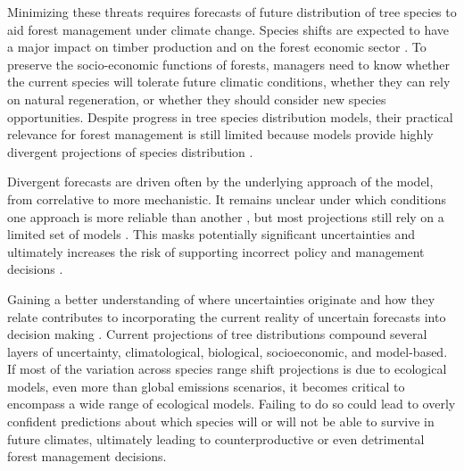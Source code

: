 \documentclass[11pt,letter]{article}
\begin{document}
Minimizing these threats requires forecasts of future distribution of tree species to aid forest management under climate change. Species shifts are expected to have a major impact on timber production and on the forest economic sector \citep{Wessely2024, Hanewinkel2013}. To preserve the socio-economic functions of forests, managers need to know whether the current species will tolerate future climatic conditions, whether they can rely on natural regeneration, or whether they should consider new species opportunities. %
Despite progress in tree species distribution models, their practical relevance for forest management is still limited because models provide highly divergent projections of species distribution \citep{Morin2009, Keenan2011a, Cheaib2012, Takolander2019}.

Divergent forecasts are driven often by the underlying approach of the model, from correlative to more mechanistic. It remains unclear under which conditions one approach is more reliable than another \citep{VanderMeersch2025}, but most projections still rely on a limited set of models \citep{Dyderski2018, Wessely2024, Hanewinkel2013, Schueler2014}. This masks potentially significant uncertainties and ultimately increases the risk of supporting incorrect policy and management decisions \citep{Dawson2011}. 

Gaining a better understanding of where uncertainties originate and how they relate contributes to incorporating the current reality of uncertain forecasts into decision making \citep{Urban2016, Saltelli2020, Johnson2024, Simmonds2024}. Current projections of tree distributions compound several layers of uncertainty, climatological, biological, socioeconomic, and model-based. If most of the variation across species range shift projections is due to ecological models, even more than global emissions scenarios, it becomes critical to encompass a wide range of ecological models. Failing to do so could lead to overly confident predictions about which species will or will not be able to survive in future climates, ultimately leading to counterproductive or even detrimental forest management decisions. %
\end{document}
